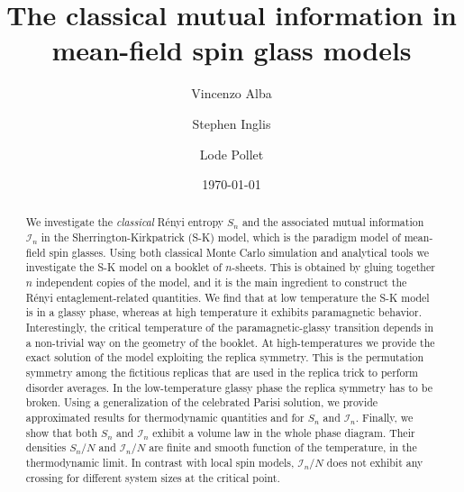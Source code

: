 \documentclass[twocolumn,superscriptaddress,prb,10pt]{revtex4-1}
\begin{document}
\title{The classical mutual information in mean-field spin glass models} 

\author{Vincenzo Alba}
\author{Stephen Inglis}
\author{Lode Pollet}

\date{\today}




\begin{abstract} 

We investigate the \emph{classical} R\'enyi entropy $S_n$ and the associated mutual 
information ${\mathcal I}_n$ in the Sherrington-Kirkpatrick (S-K) model, which is the 
paradigm model of mean-field spin glasses. 
Using both classical Monte Carlo simulation and analytical tools we investigate the S-K model 
on a booklet of $n$-sheets.
This is obtained by gluing together $n$ independent copies of the model, and it is the 
main ingredient to construct the R\'enyi entaglement-related quantities. We find that at low temperature 
the S-K model is in a glassy phase, whereas at high temperature it exhibits paramagnetic 
behavior. Interestingly, the critical temperature of the paramagnetic-glassy transition 
depends in a non-trivial way on the geometry of the booklet. At high-temperatures we provide 
the exact solution of the model exploiting the replica symmetry. This is the permutation 
symmetry among the fictitious replicas that are used in the replica trick to perform disorder 
averages. In the low-temperature glassy phase the replica symmetry has 
to be broken. Using a generalization of the celebrated Parisi solution, we provide 
approximated results for thermodynamic quantities and for $S_n$ and ${\mathcal I}_n$. 
Finally, we show that both $S_n$ and ${\mathcal I}_n$ exhibit a volume law in the whole phase 
diagram. Their densities $S_n/N$ and ${\mathcal I}_n/N$ are finite and smooth 
function of the temperature, in the thermodynamic limit. In contrast with local spin models, 
${\mathcal I}_n/N$ does not exhibit any crossing for different system sizes at the 
critical point. 

\end{abstract}
\end{document}
